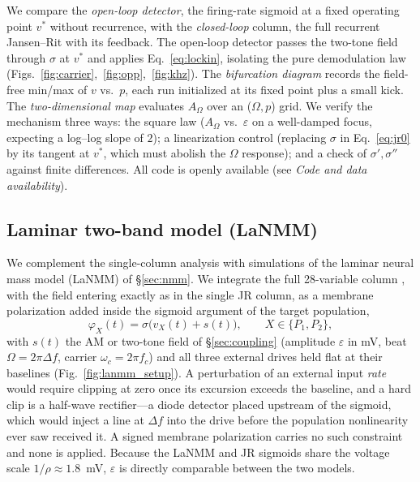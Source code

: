 \documentclass[11pt,a4paper]{article}
\newcommand{\Sig}{\sigma}
\providecommand{\DIFaddtex}[1]{{\protect\color{blue} \sf #1}} %
\providecommand{\DIFdeltex}[1]{{\protect\color{red} \scriptsize #1}} %
\providecommand{\DIFaddbegin}{} %
\providecommand{\DIFaddend}{} %
\providecommand{\DIFdelbegin}{} %
\providecommand{\DIFdelend}{} %
\providecommand{\DIFadd}[1]{\texorpdfstring{\DIFaddtex{#1}}{#1}} %
\providecommand{\DIFdel}[1]{\texorpdfstring{\DIFdeltex{#1}}{}} %
\begin{document}
We compare the \emph{open-loop detector}, the firing-rate sigmoid at a fixed
operating point $v^*$ without recurrence, with the \emph{closed-loop} column, the full recurrent
Jansen--Rit with its feedback. The open-loop detector passes the two-tone field through
$\Sig$ at $v^*$ and applies Eq.~\eqref{eq:lockin}, isolating the pure demodulation law
(Figs.~\ref{fig:carrier},~\ref{fig:opp},~\ref{fig:khz}). The \emph{bifurcation
diagram} records the field-free min/max of $v$ vs.\ $p$, each run initialized at
its fixed point plus a small kick. The \emph{two-dimensional map} evaluates
$A_\Omega$ over an ($\Omega,p$) grid. We verify the mechanism three ways: the
square law ($A_\Omega$ vs.\ $\varepsilon$ on a well-damped focus, expecting a
log--log slope of $2$); a linearization control (replacing $\Sig$ in
Eq.~\eqref{eq:jr0} by its tangent at $v^*$, which must abolish the $\Omega$
response); and a check of $\Sig',\Sig''$ against finite differences. All code is
openly available (see \emph{Code and data availability}).

\subsection{Laminar two-band model (LaNMM)}
We complement the single-column analysis with simulations of the laminar neural
mass model (LaNMM) of \S\ref{sec:nmm}. We integrate the full 28-variable column
\cite{ruffini2025cfc,sanchezTodo2023}, with the field entering \DIFdelbegin \DIFdel{exactly }\DIFdelend as in the single
JR column, as a membrane polarization added inside the sigmoid argument of the target
population,
\begin{equation}
\varphi_X(t)=\Sig\!\big(v_X(t)+s(t)\big),\qquad X\in\{P_1,P_2\},
\label{eq:lanmm_drive}
\end{equation}
with $s(t)$ the AM or two-tone field of \S\ref{sec:coupling} (amplitude $\varepsilon$ in
mV, beat $\Omega=2\pi\Delta f$, carrier $\omega_c=2\pi f_c$) and all three external drives
held flat at their baselines (Fig.~\ref{fig:lanmm_setup}). A perturbation of an external
input \emph{rate} would require clipping at zero
once its excursion exceeds the baseline, and a hard clip is a half-wave rectifier---a
diode detector placed upstream of the sigmoid, which would inject a line at $\Delta f$
into the drive before the population nonlinearity \DIFdelbegin \DIFdel{ever saw }\DIFdelend \DIFaddbegin \DIFadd{received }\DIFaddend it. A signed membrane
polarization carries no such constraint and none is applied. Because the LaNMM and JR
sigmoids share the voltage scale $1/\rho\approx1.8$~mV, $\varepsilon$ is directly
comparable between the two models.
\DIFaddbegin 
\end{document}
